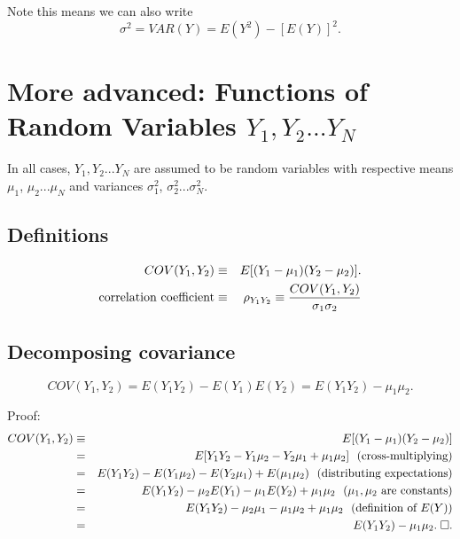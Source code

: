 \documentclass[11pt]{article}
\begin{document}
Note this means we can also write%
\begin{equation*}
\sigma ^{2}=VAR(Y)=E(Y^{2})-\left[ E\left( Y\right) \right] ^{2}.
\end{equation*}

\section{More advanced: Functions of Random Variables $Y_1, Y_2... Y_N$}

\bigskip In all cases, $Y_1, Y_2... Y_N$ are assumed to be random
variables with respective means $\mu _{1}$, $\mu _{2}$...$\mu _{N}$ and variances $\sigma
_{1}^{2}$, $\sigma _{2}^{2}...\sigma _{N}^{2}$. \bigskip

\subsection{Definitions}

\bigskip

\begin{eqnarray*}
COV(Y_{1},Y_{2}) &\equiv &E[(Y_{1}-\mu _{1})(Y_{2}-\mu _{2})]. \\
\text{correlation coefficient} &\equiv &\rho _{Y_{1}Y_{2}}\equiv \frac{%
COV(Y_{1},Y_{2})}{\sigma _{1}\sigma _{2}}
\end{eqnarray*}%
\bigskip

\subsection{Decomposing covariance\protect\bigskip}

\begin{equation*}
COV(Y_{1},Y_{2})=E(Y_{1}Y_{2})-E(Y_{1})E(Y_{2})=E(Y_{1}Y_{2})-\mu _{1}\mu
_{2}.
\end{equation*}

Proof:%
\begin{eqnarray*}
COV(Y_{1},Y_{2}) &\equiv &E[(Y_{1}-\mu _{1})(Y_{2}-\mu _{2})] \\
&=&E[Y_{1}Y_{2}-Y_{1}\mu _{2}-Y_{2}\mu _{1}+\mu _{1}\mu _{2}]\text{ \
(cross-multiplying)} \\
&=&E(Y_{1}Y_{2})-E(Y_{1}\mu _{2})-E(Y_{2}\mu _{1})+E(\mu _{1}\mu _{2})\text{
\ (distributing expectations)} \\
&=&E(Y_{1}Y_{2})-\mu _{2}E(Y_{1})-\mu _{1}E(Y_{2})+\mu _{1}\mu _{2}\text{ \ (%
}\mu _{1},\mu _{2}\text{ are constants)} \\
&=&E(Y_{1}Y_{2})-\mu _{2}\mu _{1}-\mu _{1}\mu _{2}+\mu _{1}\mu _{2}\text{ \
(definition of }E(Y)\text{)} \\
&=&E(Y_{1}Y_{2})-\mu _{1}\mu _{2}.\;\square .
\end{eqnarray*}%
\newpage 
\end{document}
